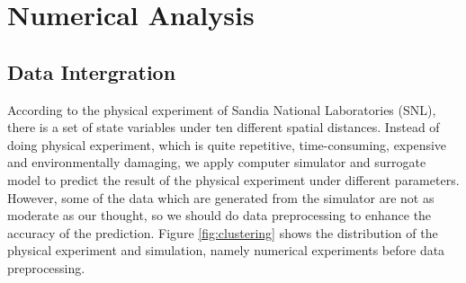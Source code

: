 \chapter{Numerical Analysis}

\section{Data Intergration}
According to the physical experiment of Sandia National Laboratories (SNL), there is a set of state variables under ten different spatial distances. Instead of doing physical experiment, which is quite repetitive, time-consuming, expensive and environmentally damaging, we apply computer simulator and surrogate model to predict the result of the physical experiment under different parameters. However, some of the data which are generated from the simulator are not as moderate as our thought, so we should do data preprocessing to enhance the accuracy of the prediction. Figure \ref{fig:clustering} shows the distribution of the physical experiment and simulation, namely numerical experiments before data preprocessing.


